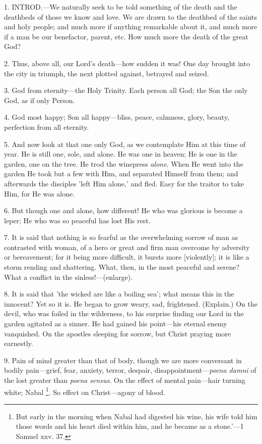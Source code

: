 
1. INTROD.—We
naturally seek to be told something of the death and the deathbeds of
those we know and love. We are drawn to the deathbed of the saints and
holy people; and much more if anything remarkable about it, and much
more if a man be our benefactor, parent, etc. How much more the death
of the great God?

2. Thus, above all, our Lord's death—how sudden
it was! One day brought into the city in triumph, the next plotted
against, betrayed and seized.

3. God from eternity—the Holy Trinity. Each
person all God; the Son the only God, as if only Person.

4. God most happy; Son all happy—bliss, peace,
calmness, glory, beauty, perfection from all eternity.

5. And now look at that one only God, as we
contemplate Him at this time of year. He is still one, sole, and
alone. He was one in heaven; He is one in the garden, one on the tree.
He trod the winepress \emph{alone}. When He went into the garden He
took but a few with Him, and separated Himself from them; and
afterwards the disciples 'left Him alone,' and fled. Easy for the
traitor to take Him, for He was alone.

6. But though one and alone, how different! He
who was glorious is become a leper; He who was so peaceful has lost
His rest.

7. It is said that nothing is so fearful as the
overwhelming sorrow of man as contrasted with woman, of a hero or
great and firm man overcome by adversity or bereavement; for it being
more difficult, it bursts more [violently]; it is like a storm rending
and shattering. What, then, in the most peaceful and serene? What a
conflict in the sinless!—(enlarge).

8. It is said that 'the wicked are like a boiling
sea'; what means this in the innocent? Yet so it is. He began to grow
weary, sad, frightened. (Explain.) On the devil, who was foiled in the
wilderness, to his surprise finding our Lord in the garden agitated as
a sinner. He had gained his point—his eternal enemy vanquished. On
the apostles sleeping for sorrow, but Christ praying more earnestly.

9. Pain of mind greater than that of body, though
we are more conversant in bodily pain—grief, fear, anxiety, terror,
despair, disappointment—\emph{poena damni} of the lost greater than \emph{poena
sensus}. On the effect of mental pain—hair turning white;
Nabal \footnote{But early in the morning
when Nabal had digested his wine, his wife told him those words and
his heart died within him, and he became as a stone.'—1 Samuel xxv.
37.}. So effect on
Christ—agony of blood.

